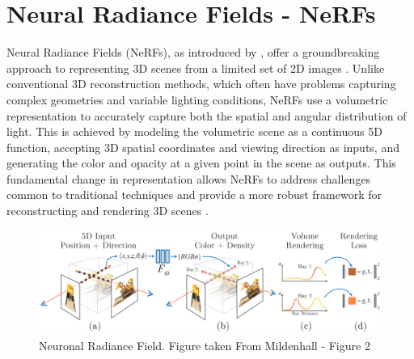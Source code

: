 \section{Neural Radiance Fields - NeRFs}
\label{NeRF}

Neural Radiance Fields (NeRFs), as introduced by \citeauthor{mildenhallNERF}, offer a groundbreaking approach to representing 3D scenes from a limited set of 2D images \citep{mildenhallNERF}. Unlike conventional 3D reconstruction methods, which often have problems capturing complex geometries and variable lighting conditions, NeRFs use a volumetric representation to accurately capture both the spatial and angular distribution of light. This is achieved by modeling the volumetric scene as a continuous 5D function, accepting 3D spatial coordinates and viewing direction as inputs, and generating the color and opacity at a given point in the scene as outputs. This fundamental change in representation allows NeRFs to address challenges common to traditional techniques and provide a more robust framework for reconstructing and rendering 3D scenes \citep{mildenhallNERF}.

\begin{figure}[ht]
    \centering
      \includegraphics[width=1\columnwidth]{figures/NeRF_Fig_2_Mildenhall.png}
      \caption{Neuronal Radiance Field. Figure taken From Mildenhall \cite{mildenhallNERF} - Figure 2}
      \label{fig:figureNeRF}
\end{figure}


